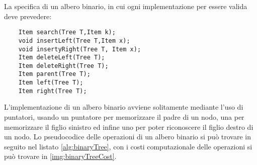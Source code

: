 La specifica di un albero binario, in cui ogni implementazione per essere valida deve prevedere:\newline
\begin{verbatim}
    Item search(Tree T,Item k);
    void insertLeft(Tree T,Item x);
    void insertyRight(Tree T, Item x);
    Item deleteLeft(Tree T);
    Item deleteRight(Tree T);
    Item parent(Tree T);
    Item left(Tree T);
    Item right(Tree T);
\end{verbatim}
L'implementazione di un albero binario avviene solitamente mediante l'uso di puntatori, usando un puntatore per memorizzare il padre di un nodo, una per memorizzare
il figlio sinistro ed infine uno per poter riconoscere il figlio destro di un nodo.\newline
Lo pseudocodice delle operazioni di un albero binario si può trovare in seguito nel listato \ref{alg:binaryTree}, con i costi computazionale delle operazioni si 
può trovare in \ref{img:binaryTreeCost}.


